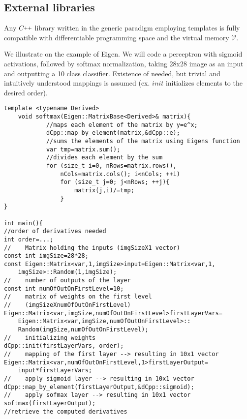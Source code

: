 \documentclass{article}
\newcommand{\VV}{\mathcal{V}}
\newcommand{\CC}{C\nolinebreak\hspace{-.05em}\raisebox{.4ex}{\tiny\bf +}\nolinebreak\hspace{-.10em}\raisebox{.4ex}{\tiny\bf +}}
\def\CC{{C\nolinebreak[4]\hspace{-.05em}\raisebox{.4ex}{\tiny\bf ++}}}
\begin{document}
\subsection{External libraries}

Any $\CC$ library written in the generic paradigm employing templates is fully compatible with differentiable programming space and the virtual memory $\VV$. 

We illustrate on the example of Eigen. We will code a perceptron with sigmoid activations, followed by softmax normalization, taking 28x28 image as an input and outputting a 10 class classifier. Existence of needed, but trivial and intuitively understood mappings is assumed (ex. $init$ initializes elements to the desired order). 

\begin{lstlisting}
template <typename Derived>
    void softmax(Eigen::MatrixBase<Derived>& matrix){
            //maps each element of the matrix by y=e^x;
            dCpp::map_by_element(matrix,&dCpp::e);
            //sums the elements of the matrix using Eigens function
            var tmp=matrix.sum();
            //divides each element by the sum
            for (size_t i=0, nRows=matrix.rows(), 
            	nCols=matrix.cols(); i<nCols; ++i)
                for (size_t j=0; j<nRows; ++j){
                    matrix(j,i)/=tmp;
                }
}

int main(){
//order of derivatives needed
int order=...;
//    Matrix holding the inputs (imgSizeX1 vector)
const int imgSize=28*28;
const Eigen::Matrix<var,1,imgSize>input=Eigen::Matrix<var,1,
	imgSize>::Random(1,imgSize);
//    number of outputs of the layer
const int numOfOutOnFirstLevel=10;
//    matrix of weights on the first level 
//    (imgSizeXnumOfOutOnFirstLevel)
Eigen::Matrix<var,imgSize,numOfOutOnFirstLevel>firstLayerVars=
	Eigen::Matrix<var,imgSize,numOfOutOnFirstLevel>::
	Random(imgSize,numOfOutOnFirstLevel);
//    initializing weights
dCpp::init(firstLayerVars, order);
//    mapping of the first layer --> resulting in 10x1 vector
Eigen::Matrix<var,numOfOutOnFirstLevel,1>firstLayerOutput=
	input*firstLayerVars;
//    apply sigmoid layer --> resulting in 10x1 vector
dCpp::map_by_element(firstLayerOutput,&dCpp::sigmoid);
//    apply sofmax layer --> resulting in 10x1 vector
softmax(firstLayerOutput);
//retrieve the computed derivatives
\end{lstlisting}

  
\end{document}
